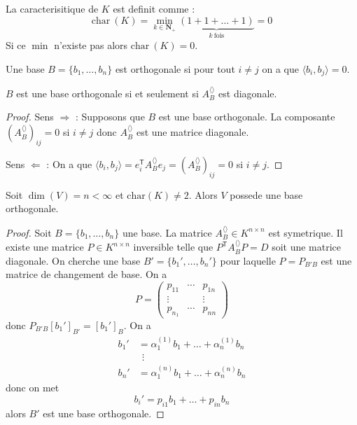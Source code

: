 \begin{definition}[Caracteristique de $K$]
La caracterisitique de $K$ est definit comme :
$$
\mathrm{char}~(K)=\min_{k\in \mathbf{N}_{+}}\underbrace{ (1+1+\dots +1)}_{ k~\text{fois} }=0
$$
Si ce $\min$ n'existe pas alors $\mathrm{char}~(K)=0$.
\end{definition}
\begin{definition}
Une base $B=\{ b_{1},\dots,b_{n} \}$ est orthogonale si pour tout $i\neq j$ on a que $\langle b_{i},b_{j} \rangle=0$.
\end{definition}
\begin{lemma}
$B$ est une base orthogonale si et seulement si $A_{B}^{\langle  \rangle}$ est diagonale.
\end{lemma}
\begin{proof}
Sens $\Rightarrow$ : Supposons que $B$ est une base orthogonale. La composante $(A_{B}^{\langle  \rangle})_{ij}=0$ si $i\neq j$ donc $A_{B}^{\langle  \rangle}$ est une matrice diagonale.

Sens $\Leftarrow$ : On a que $\langle b_{i},b_{j} \rangle=e_{i}^{\mathsf{T}}A_{B}^{\langle  \rangle}e_{j}=(A_{B}^{\langle  \rangle})_{ij}=0$ si $i\neq j$.
\end{proof}
\begin{theorem}
Soit $\dim (V)=n<\infty$ et $\mathrm{char}(K)\neq 2$. Alors $V$ possede une base orthogonale. 
\end{theorem}
\begin{proof}
Soit $B=\{ b_{1},\dots,b_{n} \}$ une base. La matrice $A_{B}^{\langle  \rangle}\in K^{n\times n}$ est symetrique. Il existe une matrice $P\in K^{n\times n}$ inversible telle que $P^{\mathsf{T}}A_{B}^{\langle  \rangle}P=D$ soit une matrice diagonale. On cherche une base $B'=\{ b_{1}',\dots,b_{n}' \}$ pour laquelle $P=P_{B'B}$ est une matrice de changement de base. On a 
$$
P=\begin{pmatrix}
p_{11} & \cdots & p_{1n} \\
\vdots &  & \vdots  \\
p_{n_{1}} & \cdots & p_{nn} 
\end{pmatrix}
$$
donc $P_{B'B}[b_{1}']_{B'}=[b_{1}']_{B}$. On a 
\begin{align*}
b_{1}' & =\alpha_{1}^{(1)}b_{1}+\dots +\alpha _{n}^{(1)}b_{n} \\
 & ~~\vdots \\
b_{n}' & =\alpha _{1}^{(n)}b_{1}+\dots +\alpha _{n}^{(n)}b_{n}
\end{align*}
donc on met 
$$
b_{i}'=p_{i1}b_{1}+\dots +p_{in}b_{n}
$$
alors $B'$ est une base orthogonale.
\end{proof}
